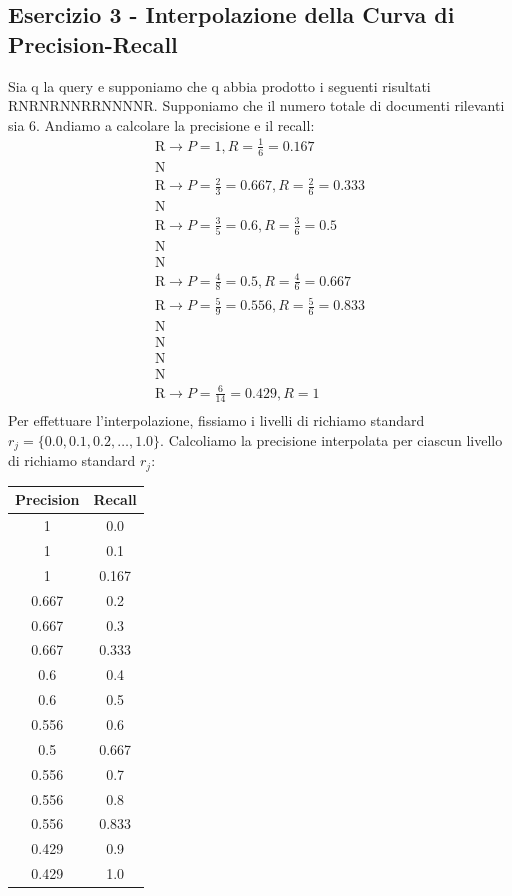 \documentclass{report}
\begin{document}
	\subsection*{Esercizio 3 - Interpolazione della Curva di Precision-Recall}
	Sia q la query e supponiamo che q abbia prodotto i seguenti risultati  RNRNRNNRRNNNNR. Supponiamo che il numero totale di documenti rilevanti sia 6. Andiamo a calcolare la precisione e il recall:
	\[
		\begin{array}{l}
			\text{R} \rightarrow P = 1, R = \frac{1}{6} = 0.167\\
			\text{N}\\
			\text{R} \rightarrow P = \frac{2}{3} = 0.667, R = \frac{2}{6} = 0.333\\
			\text{N}\\
			\text{R} \rightarrow P = \frac{3}{5} = 0.6, R = \frac{3}{6} = 0.5\\
			\text{N}\\
			\text{N}\\
			\text{R} \rightarrow P = \frac{4}{8} = 0.5, R = \frac{4}{6} = 0.667\\
			\text{R} \rightarrow P = \frac{5}{9} = 0.556, R = \frac{5}{6} = 0.833\\
			\text{N}\\
			\text{N}\\
			\text{N}\\
			\text{N}\\
			\text{R} \rightarrow P = \frac{6}{14} = 0.429, R = 1\\
			\end{array}
	\]
	Per effettuare l'interpolazione, fissiamo i livelli di richiamo standard $r_j = \{0.0, 0.1, 0.2, \ldots, 1.0\}$. Calcoliamo la precisione interpolata per ciascun livello di richiamo standard $r_j$:
	\begin{table}[H]
		\centering
		\begin{tabular}{|c|c|}
			\hline
			\textbf{Precision} & \textbf{Recall} \\ \hline
			1 & 0.0 \\ \hline
			1 & 0.1 \\ \hline
			1 & 0.167 \\ \hline
			0.667 & 0.2 \\ \hline
			0.667 & 0.3 \\ \hline
			0.667 & 0.333 \\ \hline
			0.6 & 0.4 \\ \hline
			0.6 & 0.5 \\ \hline
			0.556 & 0.6 \\ \hline
			0.5 & 0.667 \\ \hline
			0.556 & 0.7 \\ \hline
			0.556 & 0.8 \\ \hline
			0.556 & 0.833 \\ \hline
			0.429 & 0.9 \\ \hline
			0.429 & 1.0 \\ \hline
		\end{tabular}
	\end{table}
\end{document}

